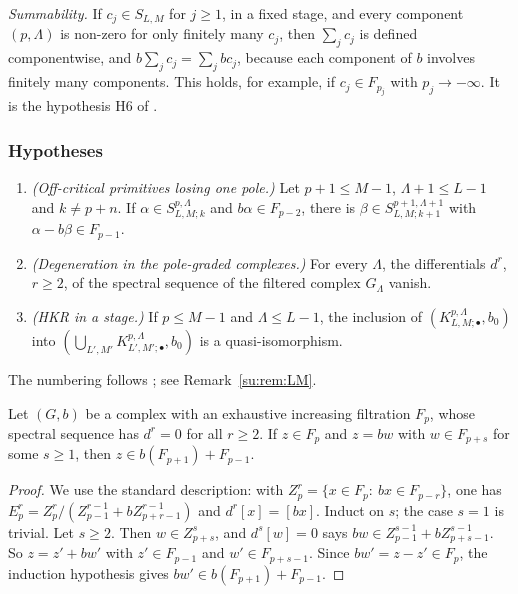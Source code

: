\emph{Summability.} If \(c_j\in S_{L,M}\) for \(j\ge1\), in a fixed
stage, and every component \((p,\Lambda)\) is non-zero for only finitely
many \(c_j\), then \(\sum_jc_j\) is defined componentwise, and
\(b\sum_jc_j=\sum_jbc_j\), because each component of \(b\) involves
finitely many components. This holds, for example, if \(c_j\in
F_{p_j}\) with \(p_j\to-\infty\). It is the hypothesis H6 of
\cite{LauterMoroianu}.

\subsubsection*{Hypotheses}
\begin{enumerate}
\item[(H1)] \emph{(Off-critical primitives losing one pole.)} Let
\(p+1\le M-1\), \(\Lambda+1\le L-1\) and \(k\ne p+n\). If \(\alpha\in
S^{p,\Lambda}_{L,M;k}\) and \(b\alpha\in F_{p-2}\), there is
\(\beta\in S^{p+1,\Lambda+1}_{L,M;k+1}\) with \(\alpha-b\beta\in F_{p-1}\).
\item[(H3)] \emph{(Degeneration in the pole-graded complexes.)} For every
\(\Lambda\), the differentials \(d^r\), \(r\ge2\), of the spectral
sequence of the filtered complex \(G_\Lambda\) vanish.
\item[(H4)] \emph{(HKR in a stage.)} If \(p\le M-1\) and \(\Lambda\le
L-1\), the inclusion of \((K^{p,\Lambda}_{L,M;\bullet},b_0)\) into
\((\bigcup_{L',M'}K^{p,\Lambda}_{L',M';\bullet},b_0)\) is a
quasi-isomorphism.
\end{enumerate}
The numbering follows \cite[App.~B]{LauterMoroianu}; see
Remark~\ref{su:rem:LM}.

\begin{lemma}[Strictness]\label{su:lem:strict}
Let \((G,b)\) be a complex with an exhaustive increasing filtration
\(F_p\), whose spectral sequence has \(d^r=0\) for all \(r\ge2\). If
\(z\in F_p\) and \(z=bw\) with \(w\in F_{p+s}\) for some \(s\ge1\), then
\(z\in b(F_{p+1})+F_{p-1}\).
\end{lemma}

\begin{proof}
We use the standard description: with \(Z^r_p=\{x\in F_p:\ bx\in
F_{p-r}\}\), one has \(E^r_p=Z^r_p/(Z^{r-1}_{p-1}+bZ^{r-1}_{p+r-1})\) and
\(d^r[x]=[bx]\). Induct on \(s\); the case \(s=1\) is trivial. Let
\(s\ge2\). Then \(w\in Z^s_{p+s}\), and \(d^s[w]=0\) says \(bw\in
Z^{s-1}_{p-1}+bZ^{s-1}_{p+s-1}\). So \(z=z'+bw'\) with \(z'\in F_{p-1}\)
and \(w'\in F_{p+s-1}\). Since \(bw'=z-z'\in F_p\), the induction
hypothesis gives \(bw'\in b(F_{p+1})+F_{p-1}\).
\end{proof}

